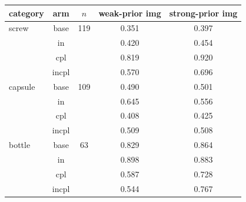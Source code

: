 \setlength{\tabcolsep}{3pt}
\begin{tabular}{@{}lcccc@{}}
\toprule
category & arm & $n$ & weak-prior img & strong-prior img \\
\midrule
screw & base & 119 & 0.351 & 0.397 \\
 & in &  & 0.420 & 0.454 \\
 & cpl &  & 0.819 & 0.920 \\
 & incpl &  & 0.570 & 0.696 \\
capsule & base & 109 & 0.490 & 0.501 \\
 & in &  & 0.645 & 0.556 \\
 & cpl &  & 0.408 & 0.425 \\
 & incpl &  & 0.509 & 0.508 \\
bottle & base & 63 & 0.829 & 0.864 \\
 & in &  & 0.898 & 0.883 \\
 & cpl &  & 0.587 & 0.728 \\
 & incpl &  & 0.544 & 0.767 \\
\bottomrule
\end{tabular}
